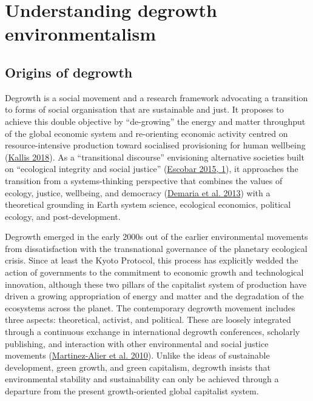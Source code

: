 \documentclass[a4paper, nobind]{templates/ociamthesis}
\begin{document}
\hypertarget{understanding-degrowth-environmentalism}{%
\section{Understanding degrowth environmentalism}\label{understanding-degrowth-environmentalism}}

\hypertarget{origins-of-degrowth}{%
\subsection{Origins of degrowth}\label{origins-of-degrowth}}

Degrowth is a social movement and a research framework advocating a transition to forms of social organisation that are sustainable and just. It proposes to achieve this double objective by ``de-growing'' the energy and matter throughput of the global economic system and re-orienting economic activity centred on resource-intensive production toward socialised provisioning for human wellbeing (\protect\hyperlink{ref-kallis_degrowth_2018}{Kallis 2018}). As a ``transitional discourse'' envisioning alternative societies built on ``ecological integrity and social justice'' (\protect\hyperlink{ref-escobar_degrowth_2015}{Escobar 2015, 1}), it approaches the transition from a systems-thinking perspective that combines the values of ecology, justice, wellbeing, and democracy (\protect\hyperlink{ref-demaria_what_2013}{Demaria et al. 2013}) with a theoretical grounding in Earth system science, ecological economics, political ecology, and post-development.

Degrowth emerged in the early 2000s out of the earlier environmental movements from dissatisfaction with the transnational governance of the planetary ecological crisis. Since at least the Kyoto Protocol, this process has explicitly wedded the action of governments to the commitment to economic growth and technological innovation, although these two pillars of the capitalist system of production have driven a growing appropriation of energy and matter and the degradation of the ecosystems across the planet. The contemporary degrowth movement includes three aspects: theoretical, activist, and political. These are loosely integrated through a continuous exchange in international degrowth conferences, scholarly publishing, and interaction with other environmental and social justice movements (\protect\hyperlink{ref-martinez-alier_sustainable_2010}{Martinez-Alier et al. 2010}). Unlike the ideas of sustainable development, green growth, and green capitalism, degrowth insists that environmental stability and sustainability can only be achieved through a departure from the present growth-oriented global capitalist system.
\end{document}
